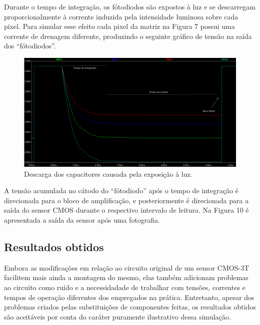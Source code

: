\documentclass[10pt,a4paper,twocolumn]{article}
\begin{document}
	Durante o tempo de integração, os fótodiodos são expostos à luz e se descarregam proporcionalmente à corrente induzida pela intensidade luminosa sobre cada pixel. Para simular esse efeito cada pixel da matriz na Figura 7 possui uma corrente de drenagem diferente, produzindo o seguinte gráfico de tensão na saída dos ``fótodiodos''.
	
	\begin{figure}[H]
		\centering
		\includegraphics[scale=0.28]{imagens/descarga.png}
		\caption{Descarga dos capacitores causada pela exposição à luz.}
	\end{figure}

	A tensão acumulada no cátodo do ``fótodiodo'' após o tempo de integração é direcionada para o bloco de amplificação, e posteriormente é direcionada para a saída do sensor CMOS durante o respectivo intervalo de leitura. Na Figura 10 é apresentada a saída da sensor após uma fotografia.
		
	\subsection*{Resultados obtidos}
	 Embora as modificações em relação ao circuito original de um sensor CMOS-3T facilitem mais ainda a montagem do mesmo, elas também adicionam problemas ao circuito como ruído e a necessidadade de trabalhar com tensões, correntes e tempos de operação diferentes dos empregados na prática. Entretanto, apesar dos problemas criados pelas substituições de componentes feitas, os resultados obtidos são aceitáveis por conta do caráter puramente ilustrativo dessa simulação.
	
\end{document}
